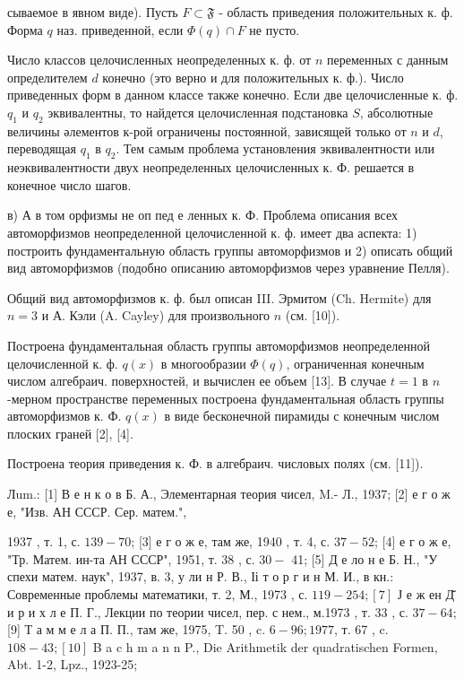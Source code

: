 \documentclass[10pt]{article}
\begin{document}
сываемое в явном виде). Пусть $F \subset \mathfrak{F}$ - область приведения положительных к. ф. Форма $q$ наз. приведенной, если $\Phi(q) \cap F$ не пусто.



Число классов целочисленных неопределенных к. ф. от $n$ переменных с данным определителем $d$ конечно (это верно и для положительных к. ф.). Число приведенных форм в данном классе также конечно. Если две целочисленные к. ф. $q_{1}$ и $q_{2}$ эквивалентны, то найдется целочисленная подстановка $S$, абсолютные величины әлементов к-рой ограничены постоянной, зависящей только от $n$ и $d$, переводящая $q_{1}$ в $q_{2}$. Тем самым проблема установления эквивалентности или неэквивалентности двух неопределенных целочисленных к. Ф. решается в конечное число шагов.



в) А в том орфизмы не оп пед е ленных к. Ф. Проблема описания всех автоморфизмов неопределенной целочисленной к. ф. имеет два аспекта: 1) построить фундаментальную область группы автоморфизмов и 2) описать общий вид автоморфизмов (подобно описанию автоморфизмов через уравнение Пелля).



Общий вид автоморфизмов к. ф. был описан III. Эрмитом (Ch. Hermite) для $n=3$ и А. Кэли (A. Cayley) для произвольного $n$ (см. [10]).



Построена фундаментальная область группы автоморфизмов неопределенной целочисленной к. ф. $q(x)$ в многообразии $\Phi(q)$, ограниченная конечным числом алгебраич. поверхностей, и вычислен ее объем [13]. В случае $t=1$ в $n$-мерном пространстве переменных построена фундаментальная область группы автоморфизмов к. Ф. $q(x)$ в виде бесконечной пирамиды с конечным числом плоских граней [2], [4].



Построена теория приведения к. Ф. в алгебраич. числовых полях (см. [11]).



Лum.: [1] В е н к о в Б. А., Элементарная теория чисел, M.- Л., 1937; [2] е г о ж е, "Изв. АН СССР. Сер. матем.",

1937 , т. 1, с. $139-70$; [3] е г о ж е, там же, 1940 , т. 4, с. $37-52$; [4] е г о ж е, "Тр. Матем. ин-та АН СССР", 1951, т. 38 , с. $30-$ 41; [5] Д е ло н е Б. Н., "У спехи матем. наук", 1937, в. 3, у ли н Р. В., Іі т о р г и н М. И., в кн.: Современные проблемы математики, т. 2, М., 1973 , с. $119-254 ;[7]$ Ј е ж ен Д̆ и р и х л е П. Г., Лекции по теории чисел, пер. с нем., м.1973 , т. 33 , с. $37-64 ;$ [9] Т а м м е л а П. П., там же, 1975, T. 50 , c. $6-96 ; 1977$, т. 67 , c. $108-43 ;[10]$ B a c h m a n n P., Die Arithmetik der quadratischen Formen, Abt. 1-2, Lpz., 1923-25;
\end{document}
